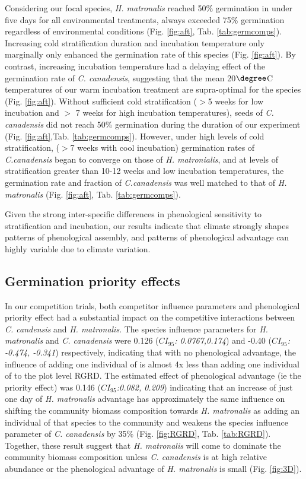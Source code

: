 \documentclass{article}\usepackage[]{graphicx}\usepackage[]{color}
\begin{document}
Considering our focal species, \textit{H. matronalis} reached 50\% germination in under five days for all environmental treatments, always exceeded 75\% germination regardless of environmental conditions (Fig. \ref{fig:aft}, Tab. {\ref{tab:germcomps}}). Increasing cold stratification duration and incubation temperature only marginally only enhanced the germination rate of this species (Fig. \ref{fig:aft}). By contrast, increasing incubation temperature had a delaying effect of the germination rate of \textit{C. canadensis}, suggesting that the mean 20$\degree$C temperatures of our warm incubation treatment are supra-optimal for the species (Fig. \ref{fig:aft}). Without sufficient cold stratification ($>$5 weeks for low incubation and $>$ 7 weeks for high incubation temperatures), seeds of  \textit{C. canadensis} did not reach 50\% germination during the duration of our experiment (Fig. \ref{fig:aft},Tab. \ref{tab:germcomps}). However, under high levels of cold stratification, ($>$7 weeks with cool incubation) germination rates of \textit{C.canadensis} began to converge on those of \textit{H. matronialis}, and at levels of stratification greater than 10-12 weeks and low incubation temperatures, the germination rate and fraction of \textit{C.canadensis} was well matched to that of \textit{H. matronalis} (Fig. \ref{fig:aft}, Tab. \ref{tab:germcomps}).

Given the strong inter-specific differences in phenological sensitivity to stratification and incubation, our results indicate that climate strongly shapes patterns of phenological assembly, and patterns of phenological advantage can highly variable due to climate variation.

\subsection*{Germination priority effects}
In our competition trials, both competitor influence parameters and phenological priority effect had a substantial impact on the competitive interactions between \textit{C. candensis} and \textit{H. matronalis}. The species influence parameters for \textit{H. matronalis} and \textit{C. canadensis} were 0.126 (\textit{$CI_{95}$: 0.0767,0.174}) and -0.40 (\textit{$CI_{95}$: -0.474, -0.341}) respectively, indicating that with no phenological advantage, the influence of adding one individual of  is almost 4x less than adding one individual of  to the plot level RGRD. The estimated effect of phenological advantage (ie the priority effect) was 0.146 (\textit{$CI_{95}$:0.082,  0.209}) indicating that an increase of just one day of \textit{H. matronalis} advantage has approximately the same influence on shifting the community biomass composition towards \textit{H. matronalis} as adding an individual of that species to the community and weakens the species influence parameter of \textit{C. canadensis} by 35\% (Fig. \ref{fig:RGRD}, Tab. \ref{tab:RGRD}). Together, these result suggest that \textit{H. matronalis} will come to dominate the community biomass composition unless \textit{C. canadensis} is at high relative abundance or the phenological advantage of \textit{H. matronalis} is small (Fig. \ref{fig:3D}).
\end{document}
